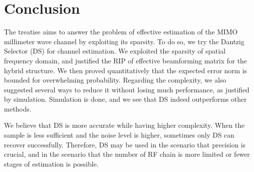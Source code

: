
\chapter {Conclusion}

The treatise aims to answer the problem of effective estimation of the MIMO millimeter wave channel by exploiting its sparsity.
To do so, we try the Dantzig Selector (DS) for channel estimation.
We exploited the sparsity of spatial frequency domain, and justified the RIP of effective beamforming matrix for the hybrid structure.
We then proved quantitatively that the expected error norm is bounded for overwhelming probability.
Regarding the complexity, we also suggested several ways to reduce it without losing much performance, as justified by simulation.
Simulation is done, and we see that DS indeed outperforms other methods.

We believe that DS is more accurate while having higher complexity.
When the sample is less sufficient and the noise level is higher, sometimes only DS can recover successfully.
Therefore, DS may be used in the scenario that precision is crucial, and in the scenario that the number of RF chain is more limited or fewer stages of estimation is possible.

